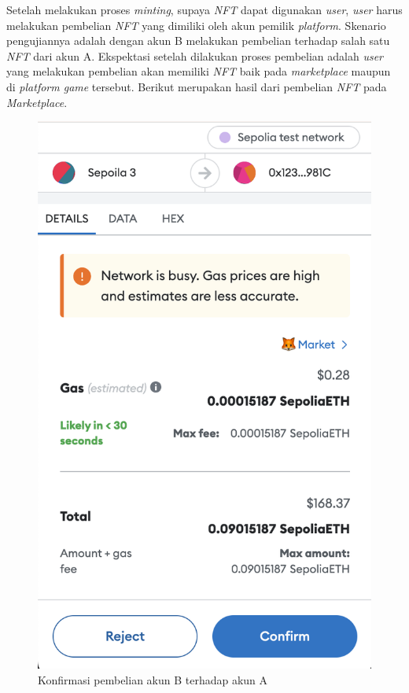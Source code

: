 Setelah melakukan proses \emph{minting}, supaya \emph{NFT} dapat digunakan \emph{user}, \emph{user} harus melakukan pembelian \emph{NFT} yang dimiliki oleh akun pemilik \emph{platform}. Skenario pengujiannya adalah dengan akun B melakukan pembelian terhadap salah satu \emph{NFT} dari akun A. Ekspektasi setelah dilakukan proses pembelian adalah \emph{user} yang melakukan pembelian akan memiliki \emph{NFT} baik pada \emph{marketplace} maupun di \emph{platform game} tersebut. Berikut merupakan hasil dari pembelian \emph{NFT} pada \emph{Marketplace}.

  \begin{figure} [H] \centering
            \includegraphics[scale=0.2]{gambar/img-test-integration-purchase-metamask-1.png}
            \caption{Konfirmasi pembelian akun B terhadap akun A}
            \label{fig:TestIntegrationPurchaseMetamask1}
        \end{figure}

